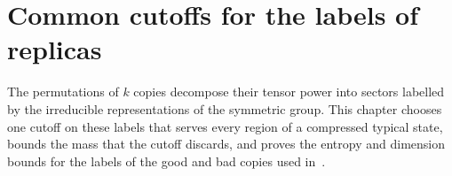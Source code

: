 \chapter{Common cutoffs for the labels of replicas}
\label{ch:label_cutoffs}

The permutations of $k$ copies decompose their tensor power into sectors
labelled by the irreducible representations of the symmetric group. This
chapter chooses one cutoff on these labels that serves every region of a
compressed typical state, bounds the mass that the cutoff discards, and proves
the entropy and dimension bounds for the labels of the good and bad copies used
in~\cite{OpenAI2026AreaLaw}.















